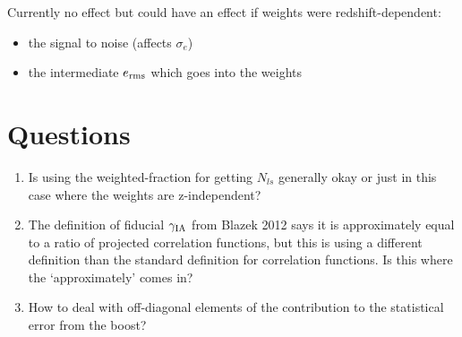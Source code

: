 \documentclass[onecolumn,amsmath,aps,fleqn, superscriptaddress]{revtex4}
\begin{document}
Currently no effect but could have an effect if weights were redshift-dependent:
\begin{itemize}
\item{the signal to noise (affects $\sigma_e$)}
\item{the intermediate $e_{\rm rms}$ which goes into the weights}
\end{itemize}

\section*{Questions}
\begin{enumerate}
\item{Is using the weighted-fraction for getting $N_{ls}$ generally okay or just in this case where the weights are z-independent? }
\item{The definition of fiducial $\gamma_{\rm IA}$ from Blazek 2012 says it is approximately equal to a ratio of projected correlation functions, but this is using a different definition than the standard definition for correlation functions. Is this where the `approximately' comes in?}
\item{How to deal with off-diagonal elements of the contribution to the statistical error from the boost?}
\end{enumerate}


\end{document}
